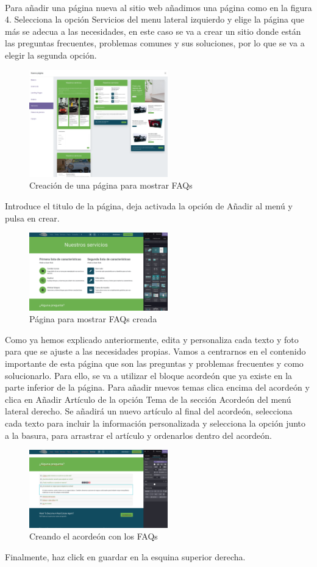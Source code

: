 \documentclass[paper=a4wide, fontsize=11pt]{report}	 %
\begin{document}
\paragraph{}
Para añadir una página nueva al sitio web añadimos una página como en la figura 4. Selecciona la opción Servicios del menu lateral izquierdo y elige la página que más se adecua a las necesidades, en este caso se va a crear un sitio donde están las preguntas frecuentes, problemas comunes y sus soluciones, por lo que se va a elegir la segunda opción.
\begin{figure}[h]
    \centering
    \includegraphics[width=6cm]{addPagina.png}
    \caption{Creación de una página para mostrar FAQs}
    \label{fig:addPagina}
\end{figure}
Introduce el titulo de la página, deja activada la opción de Añadir al menú y pulsa en crear.
\begin{figure}[h]
    \centering
    \includegraphics[width=6cm]{paginaNueva.png}
    \caption{Página para mostrar FAQs creada}
    \label{fig:paginaNueva}
\end{figure}
Como ya hemos explicado anteriormente, edita y personaliza cada texto y foto para que se ajuste a las necesidades propias. Vamos a centrarnos en el contenido importante de esta página que son las preguntas y problemas frecuentes y como solucionarlo. Para ello, se va a utilizar el bloque acordeón que ya existe en la parte inferior de la página. Para añadir nuevos temas clica encima del acordeón y clica en Añadir Artículo de la opción Tema de la sección Acordeón del menú lateral derecho. Se añadirá un nuevo artículo al final del acordeón, selecciona cada texto para incluir la información personalizada y selecciona la opción junto a la basura, para arrastrar el artículo y ordenarlos dentro del acordeón.
\begin{figure}[h]
    \centering
    \includegraphics[width=6cm]{faqs.png}
    \caption{Creando el acordeón con los FAQs}
    \label{fig:faqs}
\end{figure}
Finalmente, haz click en guardar en la esquina superior derecha.
\end{document}
